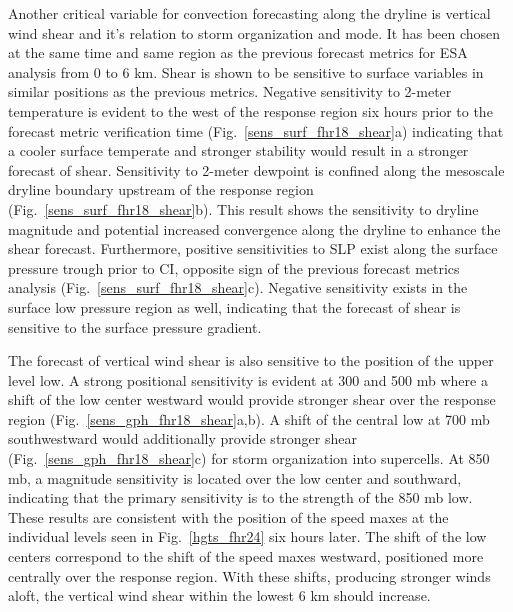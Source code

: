 \documentclass{ttuthes2007}
\newcommand{\tab}{\hspace*{2em}}  %
\begin{document}
\tab Another critical variable for convection forecasting along the dryline is vertical wind shear and it's relation to storm organization and mode. It has been chosen at the same time and same region as the previous forecast metrics for ESA analysis from 0 to 6 km. Shear is shown to be sensitive to surface variables in similar positions as the previous metrics. Negative sensitivity to 2-meter temperature is evident to the west of the response region six hours prior to the forecast metric verification time (Fig.~\ref{sens_surf_fhr18_shear}a) indicating that a cooler surface temperate and stronger stability would result in a stronger forecast of shear. Sensitivity to 2-meter dewpoint is confined along the mesoscale dryline boundary upstream of the response region (Fig.~\ref{sens_surf_fhr18_shear}b). This result shows the sensitivity to dryline magnitude and potential increased convergence along the dryline to enhance the shear forecast. Furthermore, positive sensitivities to SLP exist along the surface pressure trough prior to CI, opposite sign of the previous forecast metrics analysis (Fig.~\ref{sens_surf_fhr18_shear}c). Negative sensitivity exists in the surface low pressure region as well, indicating that the forecast of shear is sensitive to the surface pressure gradient.  

\tab The forecast of vertical wind shear is also sensitive to the position of the upper level low. A strong positional sensitivity is evident at 300 and 500 mb where a shift of the low center westward would provide stronger shear over the response region (Fig.~\ref{sens_gph_fhr18_shear}a,b). A shift of the central low at 700 mb southwestward would additionally provide stronger shear (Fig.~\ref{sens_gph_fhr18_shear}c) for storm organization into supercells. At 850 mb, a magnitude sensitivity is located over the low center and southward, indicating that the primary sensitivity is to the strength of the 850 mb low. These results are consistent with the position of the speed maxes at the individual levels seen in Fig.~\ref{hgts_fhr24} six hours later. The shift of the low centers correspond to the shift of the speed maxes westward, positioned more centrally over the response region. With these shifts, producing stronger winds aloft, the vertical wind shear within the lowest 6 km should increase.
\end{document}
